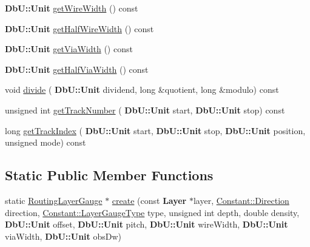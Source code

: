 \begin{DoxyCompactItemize}
\item 
\textbf{ Db\+U\+::\+Unit} \mbox{\hyperlink{classCRL_1_1RoutingLayerGauge_ab29fa7895f4fe661eb85bed9f6a5860e}{get\+Wire\+Width}} () const
\item 
\textbf{ Db\+U\+::\+Unit} \mbox{\hyperlink{classCRL_1_1RoutingLayerGauge_a57183085c39be7edcb87f4f770f8e535}{get\+Half\+Wire\+Width}} () const
\item 
\textbf{ Db\+U\+::\+Unit} \mbox{\hyperlink{classCRL_1_1RoutingLayerGauge_ac0783d29a7f9f6a2f02ac72f3196d637}{get\+Via\+Width}} () const
\item 
\textbf{ Db\+U\+::\+Unit} \mbox{\hyperlink{classCRL_1_1RoutingLayerGauge_a0f090ea25ef6f88e691fc6e572f79e16}{get\+Half\+Via\+Width}} () const
\item 
void \mbox{\hyperlink{classCRL_1_1RoutingLayerGauge_ab8d5ae22c453605226b2695c2568c4f5}{divide}} (\textbf{ Db\+U\+::\+Unit} dividend, long \&quotient, long \&modulo) const
\item 
unsigned int \mbox{\hyperlink{classCRL_1_1RoutingLayerGauge_ab9bbb7959ca58438d59709398044daae}{get\+Track\+Number}} (\textbf{ Db\+U\+::\+Unit} start, \textbf{ Db\+U\+::\+Unit} stop) const
\item 
long \mbox{\hyperlink{classCRL_1_1RoutingLayerGauge_ad61cdf130c8b739bb44a01cfd5968022}{get\+Track\+Index}} (\textbf{ Db\+U\+::\+Unit} start, \textbf{ Db\+U\+::\+Unit} stop, \textbf{ Db\+U\+::\+Unit} position, unsigned mode) const
\end{DoxyCompactItemize}
\subsection*{Static Public Member Functions}
\begin{DoxyCompactItemize}
\item 
static \mbox{\hyperlink{classCRL_1_1RoutingLayerGauge}{Routing\+Layer\+Gauge}} $\ast$ \mbox{\hyperlink{classCRL_1_1RoutingLayerGauge_afe17db013bf6a933c2af4e847bfd7918}{create}} (const \textbf{ Layer} $\ast$layer, \mbox{\hyperlink{namespaceConstant_ac081a99f2b64361919ed5d9f37c0f9af}{Constant\+::\+Direction}} direction, \mbox{\hyperlink{namespaceConstant_ab2e46a17cc373a268c5c24fa0e2067e5}{Constant\+::\+Layer\+Gauge\+Type}} type, unsigned int depth, double density, \textbf{ Db\+U\+::\+Unit} offset, \textbf{ Db\+U\+::\+Unit} pitch, \textbf{ Db\+U\+::\+Unit} wire\+Width, \textbf{ Db\+U\+::\+Unit} via\+Width, \textbf{ Db\+U\+::\+Unit} obs\+Dw)
\end{DoxyCompactItemize}


